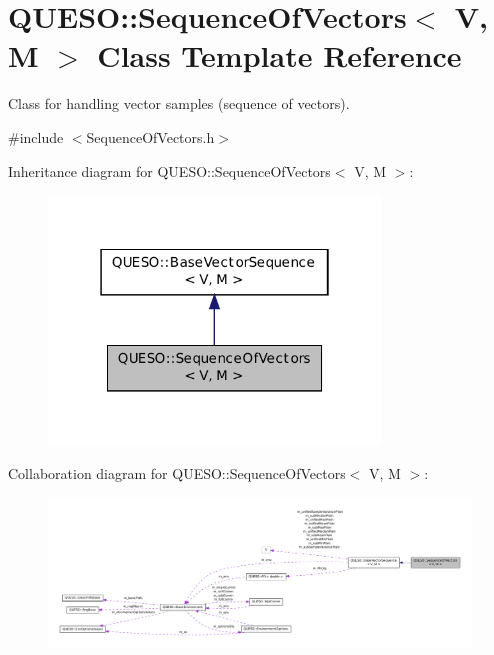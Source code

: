 \hypertarget{class_q_u_e_s_o_1_1_sequence_of_vectors}{\section{Q\-U\-E\-S\-O\-:\-:Sequence\-Of\-Vectors$<$ V, M $>$ Class Template Reference}
\label{class_q_u_e_s_o_1_1_sequence_of_vectors}
}


Class for handling vector samples (sequence of vectors).  




{\ttfamily \#include $<$Sequence\-Of\-Vectors.\-h$>$}



Inheritance diagram for Q\-U\-E\-S\-O\-:\-:Sequence\-Of\-Vectors$<$ V, M $>$\-:
\nopagebreak
\begin{figure}[H]
\begin{center}
\leavevmode
\includegraphics[width=250pt]{class_q_u_e_s_o_1_1_sequence_of_vectors__inherit__graph}
\end{center}
\end{figure}


Collaboration diagram for Q\-U\-E\-S\-O\-:\-:Sequence\-Of\-Vectors$<$ V, M $>$\-:
\nopagebreak
\begin{figure}[H]
\begin{center}
\leavevmode
\includegraphics[width=350pt]{class_q_u_e_s_o_1_1_sequence_of_vectors__coll__graph}
\end{center}
\end{figure}

